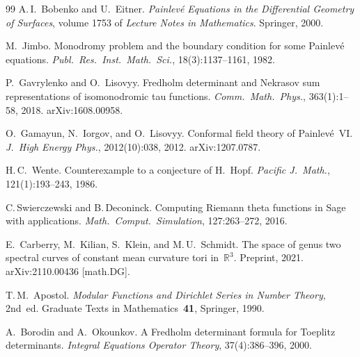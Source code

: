\documentclass[11pt,a4paper]{article}
\theoremstyle{plain}
\theoremstyle{definition}
\theoremstyle{remark}
\begin{document}
\begin{thebibliography}{99}
A.\,I.~Bobenko and U.~Eitner.
\newblock \emph{Painlev\'e Equations in the Differential Geometry of
  Surfaces}, volume 1753 of \emph{Lecture Notes in Mathematics}.
\newblock Springer, 2000.

M.~Jimbo.
\newblock Monodromy problem and the boundary condition for some
  Painlev\'e equations.
\newblock \emph{Publ.\ Res.\ Inst.\ Math.\ Sci.}, 18(3):1137--1161, 1982.

P.~Gavrylenko and O.~Lisovyy.
\newblock Fredholm determinant and Nekrasov sum representations of
  isomonodromic tau functions.
\newblock \emph{Comm.\ Math.\ Phys.}, 363(1):1--58, 2018.
\newblock arXiv:1608.00958.

O.~Gamayun, N.~Iorgov, and O.~Lisovyy.
\newblock Conformal field theory of Painlev\'e~VI.
\newblock \emph{J.\ High Energy Phys.}, 2012(10):038, 2012.
\newblock arXiv:1207.0787.

H.\,C.~Wente.
\newblock Counterexample to a conjecture of H.~Hopf.
\newblock \emph{Pacific J.\ Math.}, 121(1):193--243, 1986.

C.\,Swierczewski and B.\,Deconinck.
\newblock Computing Riemann theta functions in Sage with applications.
\newblock \emph{Math.\ Comput.\ Simulation}, 127:263--272, 2016.

E.~Carberry, M.~Kilian, S.~Klein, and M.\,U.~Schmidt.
\newblock The space of genus two spectral curves of constant mean curvature
  tori in~$\mathbb{R}^3$.
\newblock Preprint, 2021.
\newblock arXiv:2110.00436 [math.DG].

T.\,M.~Apostol.
\newblock \emph{Modular Functions and Dirichlet Series in Number Theory},
  2nd~ed.
\newblock Graduate Texts in Mathematics~\textbf{41}, Springer, 1990.

A.~Borodin and A.~Okounkov.
\newblock A Fredholm determinant formula for Toeplitz determinants.
\newblock \emph{Integral Equations Operator Theory}, 37(4):386--396, 2000.

\end{thebibliography}
\end{document}
